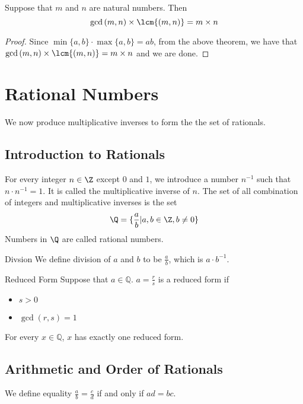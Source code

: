 \begin{thm}{}{} Suppose that $m$ and $n$ are natural numbers. Then $$\gcd{(m,n)}\times\lcm{(m,n)}=m\times n$$
\end{thm}
\begin{proof} Since $\min\{a,b\}\cdot\max\{a,b\}=ab$, from the above theorem, we have that $\gcd{(m,n)}\times\lcm{(m,n)}=m\times n$ and we are done. 
\end{proof}

\pagebreak
\section{Rational Numbers}
We now produce multiplicative inverses to form the the set of rationals. 
\subsection{Introduction to Rationals}
\begin{defn}{}{} For every integer $n\in\Z$ except $0$ and $1$, we introduce a number $n^{-1}$ such that $n\cdot n^{-1}=1$. It is called the multiplicative inverse of $n$. The set of all combination of integers and multiplicative inverses is the set $$\Q=\{\frac{a}{b}|a,b\in\Z,b\neq 0\}$$ Numbers in $\Q$ are called rational numbers. 
\end{defn}

\begin{defn}{Divsion}{} We define division of $a$ and $b$ to be $\frac{a}{b}$, which is $a\cdot b^{-1}$. 
\end{defn}

\begin{defn}{Reduced Form}{} Suppose that $a\in\mathbb{Q}$. $a=\frac{r}{s}$ is a reduced form if
\begin{itemize}
\item $s>0$
\item $\gcd{(r,s)}=1$
\end{itemize}
\end{defn}

\begin{thm}{}{} For every $x\in\mathbb{Q}$, $x$ has exactly one reduced form. 
\end{thm}

\subsection{Arithmetic and Order of Rationals}
\begin{defn}{}{} We define equality $\frac{a}{b}=\frac{c}{d}$ if and only if $ad=bc$. 
\end{defn}

